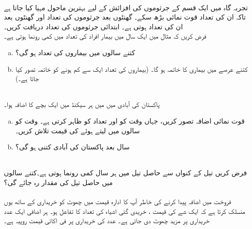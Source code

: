 \\
تجربہ گاہ میں ایک قسم کے  جرثوموں کی  افزائش کے لیے بہترین ماحول مہیا کیا جاتا ہے تاکہ  ان کی تعداد قوت نمائی بڑھ سکے۔ گھنٹوں بعد جرثوموں کی تعداد  اور  گھنٹوں بعد ان کی تعداد  ہوتی ہے۔ ابتدائی جرثوموں کی تعداد دریافت کریں۔
\\
فرض کریں کہ مثال  میں     ایک سال میں بیمار افراد کی تعداد میں  کمی رونما ہوتی ہے۔
\begin{enumerate}[a.]
\item
کتنے سالوں میں بیماروں کی تعداد  ہو گی؟
\item
کتنے عرصے میں بیماری کا خاتمہ ہو گا۔ (بیماروں کی تعداد ایک سے کم ہونے کو خاتمہ تصور کیا جاتا ہے۔) 
\end{enumerate}
\\
پاکستان کی آبادی میں  میں ہر  سیکنڈ میں ایک بچے کا اضافہ ہوا۔
\begin{enumerate}[a.]
\item
 قوت نمائی اضافہ  تصور کریں،  جہاں  وقت کو اور  تعداد کو ظاہر کرتی ہے۔ وقت کو سالوں میں لیتے ہوئے  کی قیمت تلاش کریں۔  
\item
{} سال بعد پاکستان کی آبادی کتنی ہو گی؟
\end{enumerate}
\\
فرض کریں تیل کے  کنواں سے حاصل تیل میں ہر سال  کمی رونما ہوتی ہے۔کتنے سالوں میں حاصل تیل کی مقدار  رہ جائے گی؟\\
\\
فروخت میں اضافہ پیدا کرنے کی خاطر آپ کا ادارہ قیمت میں چھوٹ کو خریداری کے ساتھ یوں منسلک کرتا ہے کہ ایک شے کی قیمت ،  خریدی گئی اشیاء کی تعداد کا تفاعل ہو۔ ہر اضافی ایک عدد خریداری پر مزید  چھوٹ دی جاتی ہے۔  عدد کی خریداری پر فی اکائی قیمت  روپیہ ہے۔
